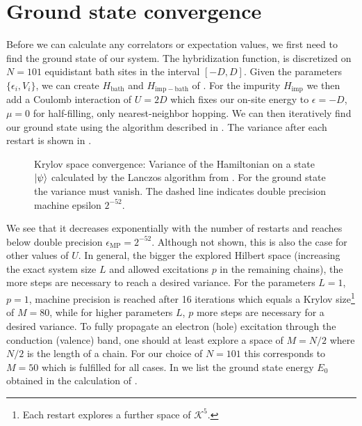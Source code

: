 \section{Ground state convergence}

Before we can calculate any correlators or expectation values,
we first need to find the ground state of our system.
The hybridization function,
is discretized on $N=101$ equidistant bath sites in the interval $[-D, D]$.
Given the parameters $\{\epsilon_i, V_i\}$,
we can create $H_\mathrm{bath}$ and $H_\mathrm{imp-bath}$ of
.
For the impurity $H_\mathrm{imp}$ we then add a Coulomb interaction of $U=2D$ which fixes our
on-site energy to $\epsilon=-D$, $\mu=0$ for half-filling, only nearest-neighbor hopping.
We can then iteratively find our ground state using the algorithm described in .
The variance after each restart is shown in .
\begin{figure}[ht]
    \centering
    
    \caption{
        Krylov space convergence:
        Variance of the Hamiltonian on a state $\lvert\psi\rangle$
        calculated by the Lanczos algorithm from .
        For the ground state the variance must vanish.
        The dashed line indicates double precision machine epsilon $2^{-52}$.
    }%
    \label{fig:ground-state-convergence}
\end{figure}
We see that it decreases exponentially with the number of restarts and reaches
below double precision $\epsilon_\mathrm{MP} = 2^{-52}$.
Although not shown,
this is also the case for other values of $U$.
In general, the bigger the explored Hilbert space
(increasing the exact system size $L$
and allowed excitations $p$ in the remaining chains),
the more steps are necessary to reach a desired variance.
For the parameters $L=1$, $p=1$, machine precision is reached after \num{16} iterations
which equals a Krylov size\footnote{
    Each restart explores a further space of $\mathcal{K}^5$.
}
of $M=80$,
while for higher parameters $L$, $p$ more steps are necessary for a desired variance.
To fully propagate an electron (hole) excitation through the conduction (valence) band,
one should at least explore a space of $M=N/2$ where $N/2$ is the length of a chain.
For our choice of $N=101$ this corresponds to $M=50$ which is fulfilled for all cases.
In  we list the ground state energy $E_0$ obtained in the
calculation of .
